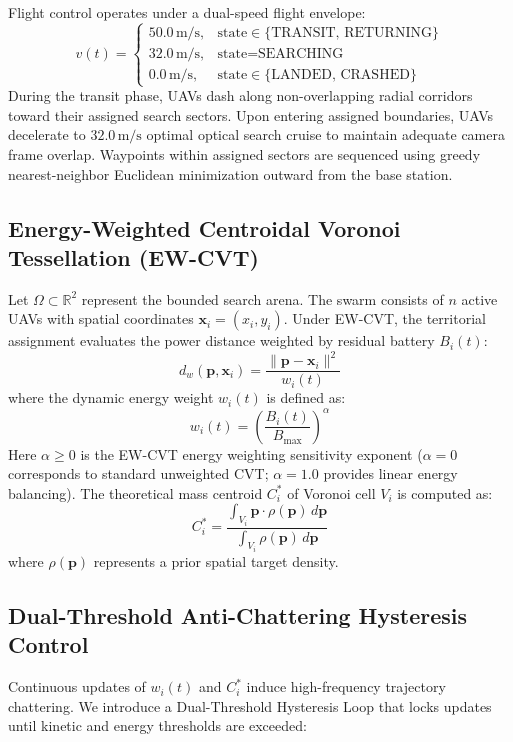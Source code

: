 \documentclass[conference]{IEEEtran}
\begin{document}
Flight control operates under a dual-speed flight envelope:
\begin{equation}
    v(t) = \begin{cases}
        50.0\,\text{m/s}, & \text{state} \in \{\text{TRANSIT, RETURNING}\} \\
        32.0\,\text{m/s}, & \text{state} = \text{SEARCHING} \\
        0.0\,\text{m/s}, & \text{state} \in \{\text{LANDED, CRASHED}\}
    \end{cases}
\end{equation}
During the transit phase, UAVs dash along non-overlapping radial corridors toward their assigned search sectors. Upon entering assigned boundaries, UAVs decelerate to $32.0\,\text{m/s}$ optimal optical search cruise to maintain adequate camera frame overlap. Waypoints within assigned sectors are sequenced using greedy nearest-neighbor Euclidean minimization outward from the base station.

\subsection{Energy-Weighted Centroidal Voronoi Tessellation (EW-CVT)}
Let $\Omega \subset \mathbb{R}^2$ represent the bounded search arena. The swarm consists of $n$ active UAVs with spatial coordinates $\mathbf{x}_i = (x_i, y_i)$. Under EW-CVT, the territorial assignment evaluates the power distance weighted by residual battery $B_i(t)$:
\begin{equation}
    d_w(\mathbf{p}, \mathbf{x}_i) = \frac{\|\mathbf{p} - \mathbf{x}_i\|^2}{w_i(t)}
\end{equation}
where the dynamic energy weight $w_i(t)$ is defined as:
\begin{equation}
    w_i(t) = \left( \frac{B_i(t)}{B_{\text{max}}} \right)^\alpha
\end{equation}
Here $\alpha \ge 0$ is the EW-CVT energy weighting sensitivity exponent ($\alpha = 0$ corresponds to standard unweighted CVT; $\alpha = 1.0$ provides linear energy balancing). The theoretical mass centroid $C_i^*$ of Voronoi cell $V_i$ is computed as:
\begin{equation}
    C_i^* = \frac{\int_{V_i} \mathbf{p} \cdot \rho(\mathbf{p}) \, d\mathbf{p}}{\int_{V_i} \rho(\mathbf{p}) \, d\mathbf{p}}
\end{equation}
where $\rho(\mathbf{p})$ represents a prior spatial target density.

\subsection{Dual-Threshold Anti-Chattering Hysteresis Control}
Continuous updates of $w_i(t)$ and $C_i^*$ induce high-frequency trajectory chattering. We introduce a Dual-Threshold Hysteresis Loop that locks updates until kinetic and energy thresholds are exceeded:
\end{document}
